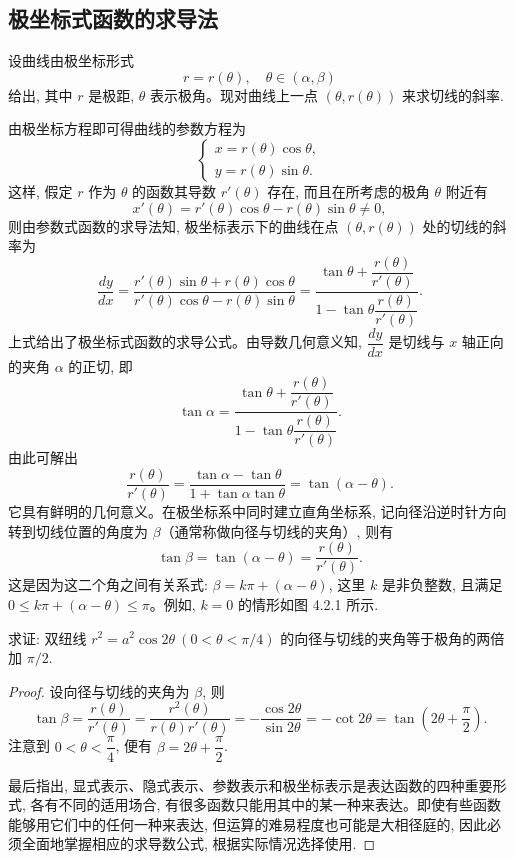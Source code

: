 \subsection{极坐标式函数的求导法}
\label{subsec:ma-4-2-6}

设曲线由极坐标形式
\[
  r=r(\theta),\quad \theta\in(\alpha,\beta)
\]
给出, 其中 $r$ 是极距, $\theta$ 表示极角。现对曲线上一点 $(\theta,r(\theta))$ 来求切线的斜率.

由极坐标方程即可得曲线的参数方程为
\[
  \begin{cases}
    x=r(\theta)\cos\theta,\\
    y=r(\theta)\sin\theta.
  \end{cases}
\]
这样, 假定 $r$ 作为 $\theta$ 的函数其导数 $r'(\theta)$ 存在, 而且在所考虑的极角 $\theta$ 附近有
\[
  x'(\theta)=r'(\theta)\cos\theta-r(\theta)\sin\theta\ne0,
\]
则由参数式函数的求导法知, 极坐标表示下的曲线在点 $(\theta,r(\theta))$ 处的切线的斜率为
\[
  \frac{dy}{dx}
  =
  \frac{r'(\theta)\sin\theta+r(\theta)\cos\theta}
       {r'(\theta)\cos\theta-r(\theta)\sin\theta}
  =
  \frac{\tan\theta+\dfrac{r(\theta)}{r'(\theta)}}
       {1-\tan\theta\dfrac{r(\theta)}{r'(\theta)}}.
\]
上式给出了极坐标式函数的求导公式。由导数几何意义知, $\dfrac{dy}{dx}$ 是切线与 $x$ 轴正向的夹角 $\alpha$ 的正切, 即
\[
  \tan\alpha=
  \frac{\tan\theta+\dfrac{r(\theta)}{r'(\theta)}}
       {1-\tan\theta\dfrac{r(\theta)}{r'(\theta)}}.
\]
由此可解出
\[
  \frac{r(\theta)}{r'(\theta)}
  =
  \frac{\tan\alpha-\tan\theta}{1+\tan\alpha\tan\theta}
  =
  \tan(\alpha-\theta).
\]
它具有鲜明的几何意义。在极坐标系中同时建立直角坐标系, 记向径沿逆时针方向转到切线位置的角度为 $\beta$（通常称做向径与切线的夹角）, 则有
\[
  \tan\beta=\tan(\alpha-\theta)=\frac{r(\theta)}{r'(\theta)}.
\]
这是因为这二个角之间有关系式: $\beta=k\pi+(\alpha-\theta)$, 这里 $k$ 是非负整数, 且满足 $0\leqslant k\pi+(\alpha-\theta)\leqslant\pi$。例如, $k=0$ 的情形如图 4.2.1 所示.

\begin{example}\label{example:ma-4-2-14}
求证: 双纽线 $r^2=a^2\cos2\theta\ (0<\theta<\pi/4)$ 的向径与切线的夹角等于极角的两倍加 $\pi/2$.
\end{example}


\begin{proof}
设向径与切线的夹角为 $\beta$, 则
\[
  \tan\beta
  =
  \frac{r(\theta)}{r'(\theta)}
  =
  \frac{r^2(\theta)}{r(\theta)r'(\theta)}
  =
  -\frac{\cos2\theta}{\sin2\theta}
  =
  -\cot2\theta
  =
  \tan\left(2\theta+\frac{\pi}{2}\right).
\]
注意到 $0<\theta<\dfrac{\pi}{4}$, 便有 $\beta=2\theta+\dfrac{\pi}{2}$.

最后指出, 显式表示、隐式表示、参数表示和极坐标表示是表达函数的四种重要形式, 各有不同的适用场合, 有很多函数只能用其中的某一种来表达。即使有些函数能够用它们中的任何一种来表达, 但运算的难易程度也可能是大相径庭的, 因此必须全面地掌握相应的求导数公式, 根据实际情况选择使用.
\end{proof}


